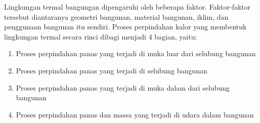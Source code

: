 Lingkungan termal bangungan dipengaruhi oleh beberapa faktor. Faktor-faktor tersebut diantaranya geometri bangunan, material bangunan, iklim, dan penggunaan bangunan itu sendiri. Proses perpindahan kalor yang membentuk lingkungan termal secara rinci dibagi menjadi 4 bagian, yaitu:

\begin{enumerate}
	\item Proses perpindahan panas yang terjadi di muka luar dari selubung bangunan
	\item Proses perpindahan panas yang terjadi di selubung bangunan
	\item Proses perpindahan panas yang terjadi di muka dalam dari selubung bangunan
	\item Proses perpindahan panas dan massa yang terjadi di udara dalam bangunan
\end{enumerate}






